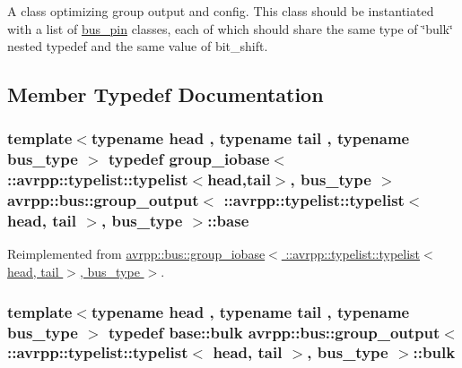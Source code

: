 A class optimizing group output and config. This class should be instantiated with a list of \hyperlink{structavrpp_1_1bus_1_1bus__pin}{bus\_\-pin} classes, each of which should share the same type of \char`\"{}bulk\char`\"{} nested typedef and the same value of bit\_\-shift. 

\subsection{Member Typedef Documentation}
\hypertarget{structavrpp_1_1bus_1_1group__output_3_01_1_1avrpp_1_1typelist_1_1typelist_3_01head_00_01tail_01_4_00_01bus__type_01_4_a4c3ea4f3290eb5dc3b45e83634820404}{
\subsubsection[{base}]{\setlength{\rightskip}{0pt plus 5cm}template$<$typename head , typename tail , typename bus\_\-type $>$ typedef group\_\-iobase$<$ ::{\bf avrpp::typelist::typelist}$<$head,tail$>$, bus\_\-type $>$ avrpp::bus::group\_\-output$<$ ::{\bf avrpp::typelist::typelist}$<$ head, tail $>$, bus\_\-type $>$::{\bf base}}}
\label{structavrpp_1_1bus_1_1group__output_3_01_1_1avrpp_1_1typelist_1_1typelist_3_01head_00_01tail_01_4_00_01bus__type_01_4_a4c3ea4f3290eb5dc3b45e83634820404}


Reimplemented from \hyperlink{structavrpp_1_1bus_1_1group__iobase_3_01_1_1avrpp_1_1typelist_1_1typelist_3_01head_00_01tail_01_4_00_01bus__type_01_4_a3c2a3f7afa6c666e7a625d027e9e89e0}{avrpp::bus::group\_\-iobase$<$ ::avrpp::typelist::typelist$<$ head, tail $>$, bus\_\-type $>$}.

\hypertarget{structavrpp_1_1bus_1_1group__output_3_01_1_1avrpp_1_1typelist_1_1typelist_3_01head_00_01tail_01_4_00_01bus__type_01_4_ad2d880eba1fe7e186d50827f72aaefae}{
\subsubsection[{bulk}]{\setlength{\rightskip}{0pt plus 5cm}template$<$typename head , typename tail , typename bus\_\-type $>$ typedef base::bulk avrpp::bus::group\_\-output$<$ ::{\bf avrpp::typelist::typelist}$<$ head, tail $>$, bus\_\-type $>$::{\bf bulk}}}
\label{structavrpp_1_1bus_1_1group__output_3_01_1_1avrpp_1_1typelist_1_1typelist_3_01head_00_01tail_01_4_00_01bus__type_01_4_ad2d880eba1fe7e186d50827f72aaefae}


